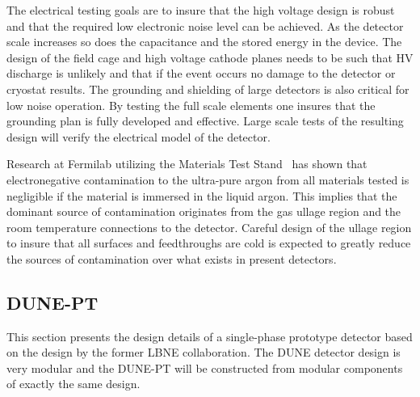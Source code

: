 	 
	 The electrical testing goals are to insure that the high voltage design is robust and that the required low electronic noise level can be achieved. As the detector scale increases so does the capacitance and the stored energy in the device. The design of the field cage and high voltage cathode planes needs to be such that HV discharge is unlikely and that if the event occurs no damage to the detector or cryostat results. The grounding and shielding of large detectors is also critical for low noise operation. By testing the full scale elements one insures that the grounding plan is fully developed and effective. Large scale tests of the resulting design will verify the electrical model of the detector. 

	 Research at Fermilab utilizing the Materials Test Stand~\cite{mat-test-stand} has shown that electronegative contamination to the ultra-pure argon from all materials tested is negligible if the material is immersed in the liquid argon. This implies that the dominant source of contamination originates from the gas ullage region and the room temperature connections to the detector. Careful design of the ullage region to insure that all surfaces and feedthroughs are cold is expected to greatly reduce the sources of contamination over what exists in present detectors. 
	 
\subsection{DUNE-PT}


This section presents the design details of a single-phase prototype detector based on the design by the former LBNE collaboration. 
The DUNE detector design is very modular and the DUNE-PT will be constructed from modular components of exactly the same design.

